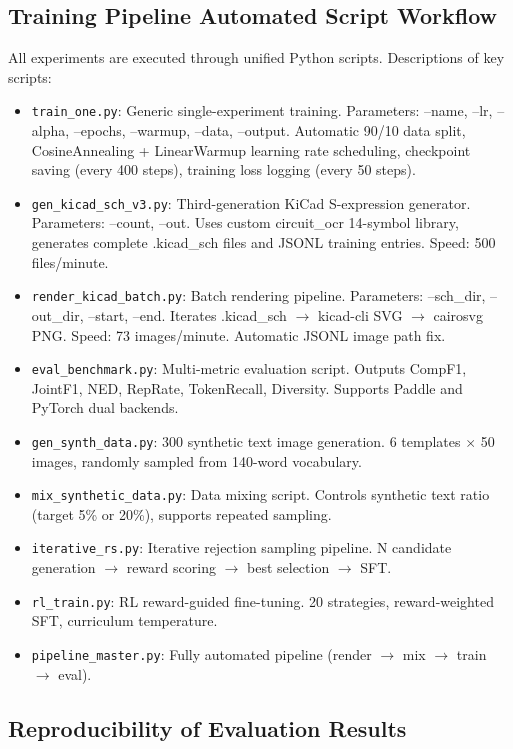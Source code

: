 \subsection{Training Pipeline Automated Script Workflow}

All experiments are executed through unified Python scripts. Descriptions of key scripts:

\begin{itemize}[nosep]
    \item \texttt{train\_one.py}: Generic single-experiment training. Parameters: --name, --lr, --alpha, --epochs, --warmup, --data, --output. Automatic 90/10 data split, CosineAnnealing + LinearWarmup learning rate scheduling, checkpoint saving (every 400 steps), training loss logging (every 50 steps).
    \item \texttt{gen\_kicad\_sch\_v3.py}: Third-generation KiCad S-expression generator. Parameters: --count, --out. Uses custom circuit\_ocr 14-symbol library, generates complete .kicad\_sch files and JSONL training entries. Speed: 500 files/minute.
    \item \texttt{render\_kicad\_batch.py}: Batch rendering pipeline. Parameters: --sch\_dir, --out\_dir, --start, --end. Iterates .kicad\_sch $\to$ kicad-cli SVG $\to$ cairosvg PNG. Speed: 73 images/minute. Automatic JSONL image path fix.
    \item \texttt{eval\_benchmark.py}: Multi-metric evaluation script. Outputs CompF1, JointF1, NED, RepRate, TokenRecall, Diversity. Supports Paddle and PyTorch dual backends.
    \item \texttt{gen\_synth\_data.py}: 300 synthetic text image generation. 6 templates $\times$ 50 images, randomly sampled from 140-word vocabulary.
    \item \texttt{mix\_synthetic\_data.py}: Data mixing script. Controls synthetic text ratio (target 5\% or 20\%), supports repeated sampling.
    \item \texttt{iterative\_rs.py}: Iterative rejection sampling pipeline. N candidate generation $\to$ reward scoring $\to$ best selection $\to$ SFT.
    \item \texttt{rl\_train.py}: RL reward-guided fine-tuning. 20 strategies, reward-weighted SFT, curriculum temperature.
    \item \texttt{pipeline\_master.py}: Fully automated pipeline (render $\to$ mix $\to$ train $\to$ eval).
\end{itemize}

\subsection{Reproducibility of Evaluation Results}

